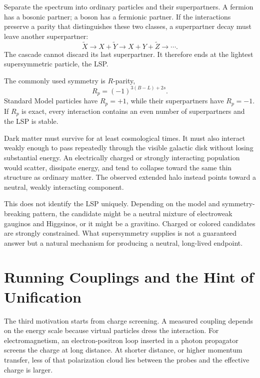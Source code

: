 Separate the spectrum into ordinary particles and their superpartners. A fermion has a bosonic partner; a boson has a fermionic partner. If the interactions preserve a parity that distinguishes these two classes, a superpartner decay must leave another superpartner:
\begin{equation}
\widetilde X
\longrightarrow X+\widetilde Y
\longrightarrow X+Y+\widetilde Z
\longrightarrow\cdots.
\end{equation}
The cascade cannot discard its last superpartner. It therefore ends at the lightest supersymmetric particle, the LSP.

The commonly used symmetry is \(R\)-parity,
\begin{equation}
R_p=(-1)^{3(B-L)+2s}.
\end{equation}
Standard Model particles have \(R_p=+1\), while their superpartners have \(R_p=-1\). If \(R_p\) is exact, every interaction contains an even number of superpartners and the LSP is stable.

Dark matter must survive for at least cosmological times. It must also interact weakly enough to pass repeatedly through the visible galactic disk without losing substantial energy. An electrically charged or strongly interacting population would scatter, dissipate energy, and tend to collapse toward the same thin structure as ordinary matter. The observed extended halo instead points toward a neutral, weakly interacting component.

This does not identify the LSP uniquely. Depending on the model and symmetry-breaking pattern, the candidate might be a neutral mixture of electroweak gauginos and Higgsinos, or it might be a gravitino. Charged or colored candidates are strongly constrained. What supersymmetry supplies is not a guaranteed answer but a natural mechanism for producing a neutral, long-lived endpoint.

\section{Running Couplings and the Hint of Unification}

The third motivation starts from charge screening. A measured coupling depends on the energy scale because virtual particles dress the interaction. For electromagnetism, an electron-positron loop inserted in a photon propagator screens the charge at long distance. At shorter distance, or higher momentum transfer, less of that polarization cloud lies between the probes and the effective charge is larger.

